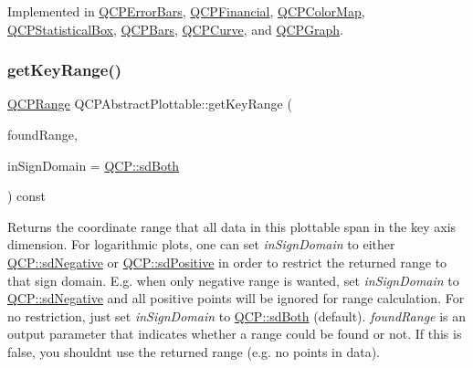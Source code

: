 Implemented in \mbox{\hyperlink{class_q_c_p_error_bars_a20f5d292e66103f26bca00b11ce417b4}{Q\+C\+P\+Error\+Bars}}, \mbox{\hyperlink{class_q_c_p_financial_a53f6ef2cddb650993f04c66e39a04942}{Q\+C\+P\+Financial}}, \mbox{\hyperlink{class_q_c_p_color_map_adeaa5e262a03b7f021bd1aa6f1e60ce9}{Q\+C\+P\+Color\+Map}}, \mbox{\hyperlink{class_q_c_p_statistical_box_ad286c63a79c21d5231a4b6c6fdbb914f}{Q\+C\+P\+Statistical\+Box}}, \mbox{\hyperlink{class_q_c_p_bars_aee7c3e1763fd6b504c45baa8775be7b7}{Q\+C\+P\+Bars}}, \mbox{\hyperlink{class_q_c_p_curve_aac6e94afbce4002d2cd7793250154e84}{Q\+C\+P\+Curve}}, and \mbox{\hyperlink{class_q_c_p_graph_a6efbab06c400bdb15e28b2d0a4ecc18a}{Q\+C\+P\+Graph}}.

\mbox{\label{class_q_c_p_abstract_plottable_a4da16d3cd4b509e1104a9b0275623c96}} 
\subsubsection{\texorpdfstring{getKeyRange()}{getKeyRange()}}
{\footnotesize\ttfamily \mbox{\hyperlink{class_q_c_p_range}{Q\+C\+P\+Range}} Q\+C\+P\+Abstract\+Plottable\+::get\+Key\+Range (\begin{DoxyParamCaption}\item[{bool \&}]{found\+Range,  }\item[{\mbox{\hyperlink{namespace_q_c_p_afd50e7cf431af385614987d8553ff8a9}{Q\+C\+P\+::\+Sign\+Domain}}}]{in\+Sign\+Domain = {\ttfamily \mbox{\hyperlink{namespace_q_c_p_afd50e7cf431af385614987d8553ff8a9aa38352ef02d51ddfa4399d9551566e24}{Q\+C\+P\+::sd\+Both}}} }\end{DoxyParamCaption}) const\hspace{0.3cm}{\ttfamily [pure virtual]}}

Returns the coordinate range that all data in this plottable span in the key axis dimension. For logarithmic plots, one can set {\itshape in\+Sign\+Domain} to either \mbox{\hyperlink{namespace_q_c_p_afd50e7cf431af385614987d8553ff8a9a2d18af0bc58f6528d1e82ce699fe4829}{Q\+C\+P\+::sd\+Negative}} or \mbox{\hyperlink{namespace_q_c_p_afd50e7cf431af385614987d8553ff8a9a584784b75fb816abcc627cf743bb699f}{Q\+C\+P\+::sd\+Positive}} in order to restrict the returned range to that sign domain. E.\+g. when only negative range is wanted, set {\itshape in\+Sign\+Domain} to \mbox{\hyperlink{namespace_q_c_p_afd50e7cf431af385614987d8553ff8a9a2d18af0bc58f6528d1e82ce699fe4829}{Q\+C\+P\+::sd\+Negative}} and all positive points will be ignored for range calculation. For no restriction, just set {\itshape in\+Sign\+Domain} to \mbox{\hyperlink{namespace_q_c_p_afd50e7cf431af385614987d8553ff8a9aa38352ef02d51ddfa4399d9551566e24}{Q\+C\+P\+::sd\+Both}} (default). {\itshape found\+Range} is an output parameter that indicates whether a range could be found or not. If this is false, you shouldn\textquotesingle{}t use the returned range (e.\+g. no points in data).

